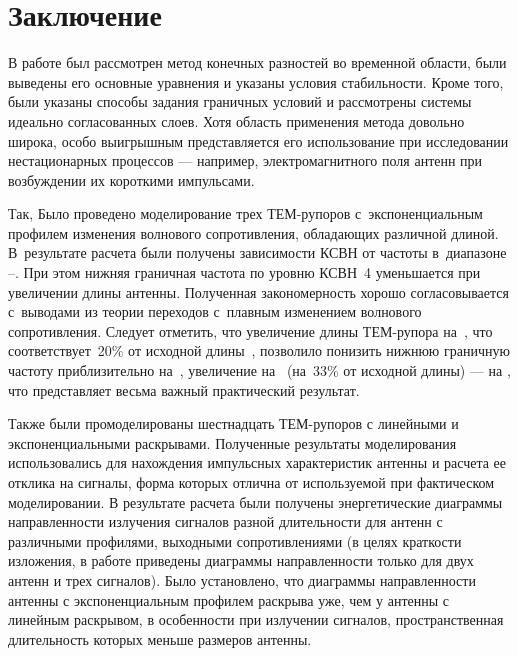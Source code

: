 \chapter*{Заключение}

В работе был рассмотрен метод конечных разностей во временной области, были
выведены его основные уравнения и указаны условия стабильности.
Кроме того, были указаны способы задания граничных условий и рассмотрены
системы идеально согласованных слоев. Хотя область применения метода довольно широка, особо
выигрышным представляется его использование при исследовании нестационарных
процессов --- например, электромагнитного поля антенн при возбуждении их
короткими импульсами.

Так, Было проведено моделирование трех ТЕМ-рупоров с~экспоненциальным профилем
изменения волнового
сопротивления, обладающих различной длиной. В~результате расчета были получены
зависимости КСВН от частоты в~диапазоне --. При этом
нижняя граничная частота по уровню КСВН~4 уменьшается при увеличении длины
антенны. Полученная закономерность хорошо согласовывается с~выводами из теории
переходов с~плавным изменением волнового сопротивления. Следует отметить,
что увеличение длины ТЕМ-рупора на~, что соответствует~20\% от
исходной длины~, позволило понизить нижнюю граничную частоту
приблизительно на~, увеличение на~ (на~33\% от
исходной длины) --- на , что представляет весьма важный
практический результат.

Также были промоделированы шестнадцать ТЕМ-рупоров с линейными
и экспоненциальными раскрывами. Полученные результаты моделирования
использовались для нахождения импульсных характеристик антенны и расчета ее
отклика на сигналы, форма которых отлична от используемой при фактическом
моделировании. В результате расчета были получены энергетические диаграммы
направленности излучения сигналов разной длительности для антенн с различными
профилями, выходными сопротивлениями (в целях краткости изложения, в работе
приведены диаграммы направленности только для двух антенн и трех сигналов).
Было установлено, что диаграммы направленности антенны с экспоненциальным
профилем раскрыва уже, чем у антенны с линейным раскрывом, в особенности при
излучении сигналов, пространственная длительность которых меньше размеров
антенны.

